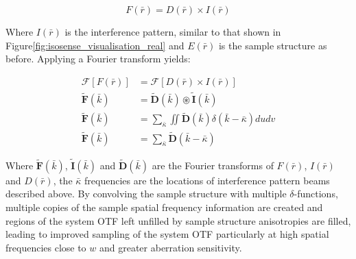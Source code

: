 \begin{equation}\label{eq:isosense_real}
F(\bar{r}) = D(\bar{r}) \times I(\bar{r})
\end{equation}	

Where $I(\bar{r})$ is the interference pattern, similar to that shown in 
Figure\ref{fig:isosense_visualisation_real} and $E(\bar{r})$ is the sample
structure as before. Applying a Fourier transform yields:

\begin{equation}\label{eq:isosense_ft}
\begin{split}
\mathcal{F}[F(\bar{r})] &= \mathcal{F}[D(\bar{r})\times I(\bar{r})] \\
\tilde{\textbf{F}}(\bar{k}) &= \tilde{\textbf{D}}(\bar{k}) \circledast \tilde{\textbf{I}}(\bar{k}) \\
\tilde{\textbf{F}}(\bar{k}) &= \sum_{\bar{\kappa}}\iint\tilde{\textbf{D}}(\bar{k})\delta(\bar{k} - \bar{\kappa})dudv \\
\tilde{\textbf{F}}(\bar{k}) &= \sum_{\bar{\kappa}}\tilde{\textbf{D}}(\bar{k} - \bar{\kappa})
\end{split}
\end{equation}

Where $\tilde{\textbf{F}}(\bar{k})$, $\tilde{\textbf{I}}(\bar{k})$ and 
$\tilde{\textbf{D}}(\bar{k})$ are the Fourier transforms of $F(\bar{r})$, 
$I(\bar{r})$ and $D(\bar{r})$, the $\bar{\kappa}$ frequencies are the 
locations of interference pattern beams described above. By convolving 
the sample structure with multiple $\delta$-functions, multiple copies 
of the sample spatial frequency information are created and regions of 
the system OTF left unfilled by sample structure anisotropies are 
filled, leading to improved sampling of the system OTF particularly
at high spatial frequencies close to $w$ and greater aberration
sensitivity.\cite{vzurauskas2019isosense}

